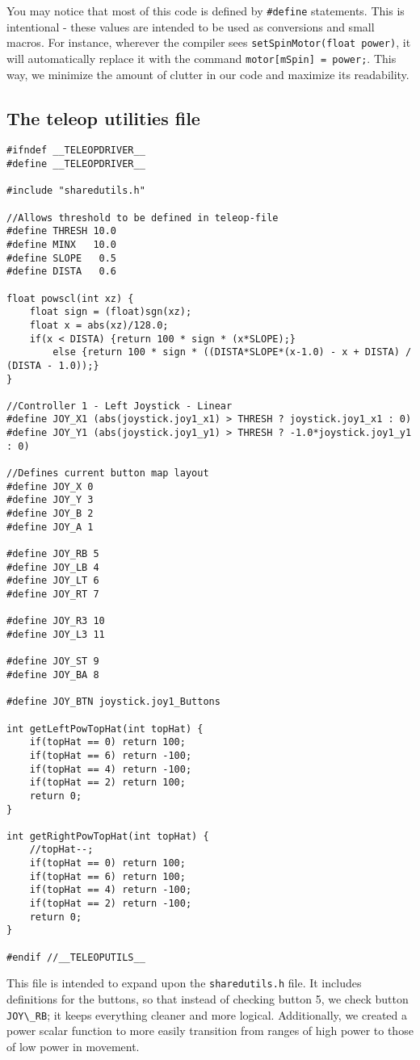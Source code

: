 You may notice that most of this code is defined by \lstinline{#define} statements. This is intentional - these values are intended to be used as conversions and small macros. For instance, wherever the compiler sees \lstinline{setSpinMotor(float power)}, it will automatically replace it with the command \lstinline{motor[mSpin] = power;}. This way, we minimize the amount of clutter in our code and maximize its readability.

\subsection{The teleop utilities file}
\begin{lstlisting}
#ifndef __TELEOPDRIVER__
#define __TELEOPDRIVER__

#include "sharedutils.h"

//Allows threshold to be defined in teleop-file
#define THRESH 10.0
#define MINX   10.0
#define SLOPE   0.5
#define DISTA   0.6

float powscl(int xz) {
	float sign = (float)sgn(xz);
	float x = abs(xz)/128.0;
	if(x < DISTA) {return 100 * sign * (x*SLOPE);}
		else {return 100 * sign * ((DISTA*SLOPE*(x-1.0) - x + DISTA) / (DISTA - 1.0));}
}

//Controller 1 - Left Joystick - Linear
#define JOY_X1 (abs(joystick.joy1_x1) > THRESH ? joystick.joy1_x1 : 0)
#define JOY_Y1 (abs(joystick.joy1_y1) > THRESH ? -1.0*joystick.joy1_y1 : 0)

//Defines current button map layout
#define JOY_X 0
#define JOY_Y 3
#define JOY_B 2
#define JOY_A 1

#define JOY_RB 5
#define JOY_LB 4
#define JOY_LT 6
#define JOY_RT 7

#define JOY_R3 10
#define JOY_L3 11

#define JOY_ST 9
#define JOY_BA 8

#define JOY_BTN joystick.joy1_Buttons

int getLeftPowTopHat(int topHat) {
	if(topHat == 0) return 100;
	if(topHat == 6) return -100;
	if(topHat == 4) return -100;
	if(topHat == 2) return 100;
	return 0;
}

int getRightPowTopHat(int topHat) {
	//topHat--;
	if(topHat == 0) return 100;
	if(topHat == 6) return 100;
	if(topHat == 4) return -100;
	if(topHat == 2) return -100;
	return 0;
}

#endif //__TELEOPUTILS__
\end{lstlisting}

This file is intended to expand upon the \lstinline{sharedutils.h} file. It includes definitions for the buttons, so that instead of checking button 5, we check button \lstinline{JOY\_RB}; it keeps everything cleaner and more logical. Additionally, we created a power scalar function to more easily transition from ranges of high power to those of low power in movement.

